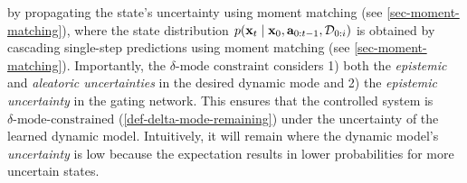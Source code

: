 \documentclass[twoside]{article}
\newcommand{\state}{\ensuremath{\mathbf{x}}}
\begin{document}
by propagating the state's uncertainty using moment matching (see \cref{sec-moment-matching}),
where the state distribution
\({p(\state_{\timeInd} \mid \state_{0}, \action_{0:\timeInd-1}, \mathcal{D}_{0:i})}\) is obtained by cascading single-step predictions using
moment matching (see \cref{sec-moment-matching}).
Importantly, the \(\delta\text{-mode constraint}\) considers 1) both the \emph{epistemic} and \emph{aleatoric uncertainties} in the desired dynamic mode
and 2) the \emph{epistemic uncertainty} in the gating network.
This ensures that the controlled system is \(\delta\text{-mode-constrained}\) (\cref{def-delta-mode-remaining}) under the uncertainty of the learned dynamic model.
Intuitively, it will remain where the dynamic model's \emph{uncertainty} is low because the expectation results in lower probabilities for more uncertain states.
\end{document}
